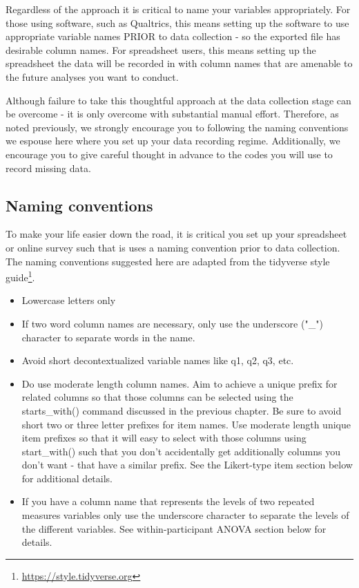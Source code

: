 \documentclass[
]{krantz}
\renewcommand{\href}[2]{#2\footnote{\url{#1}}}
\begin{document}
Regardless of the approach it is critical to name your variables appropriately. For those using software, such as Qualtrics, this means setting up the software to use appropriate variable names PRIOR to data collection - so the exported file has desirable column names. For spreadsheet users, this means setting up the spreadsheet the data will be recorded in with column names that are amenable to the future analyses you want to conduct.

Although failure to take this thoughtful approach at the data collection stage can be overcome - it is only overcome with substantial manual effort. Therefore, as noted previously, we strongly encourage you to following the naming conventions we espouse here where you set up your data recording regime. Additionally, we encourage you to give careful thought in advance to the codes you will use to record missing data.

\hypertarget{naming-conventions}{%
\subsection{Naming conventions}\label{naming-conventions}}

To make your life easier down the road, it is critical you set up your spreadsheet or online survey such that is uses a naming convention prior to data collection. The naming conventions suggested here are adapted from the tidyverse \href{https://style.tidyverse.org}{style guide}.

\begin{itemize}
\item
  Lowercase letters only
\item
  If two word column names are necessary, only use the underscore ("\_") character to separate words in the name.
\item
  Avoid short decontextualized variable names like q1, q2, q3, etc.
\item
  Do use moderate length column names. Aim to achieve a unique prefix for related columns so that those columns can be selected using the starts\_with() command discussed in the previous chapter. Be sure to avoid short two or three letter prefixes for item names. Use moderate length unique item prefixes so that it will easy to select with those columns using start\_with() such that you don't accidentally get additionally columns you don't want - that have a similar prefix. See the Likert-type item section below for additional details.
\item
  If you have a column name that represents the levels of two repeated measures variables only use the underscore character to separate the levels of the different variables. See within-participant ANOVA section below for details.
\end{itemize}
\end{document}
